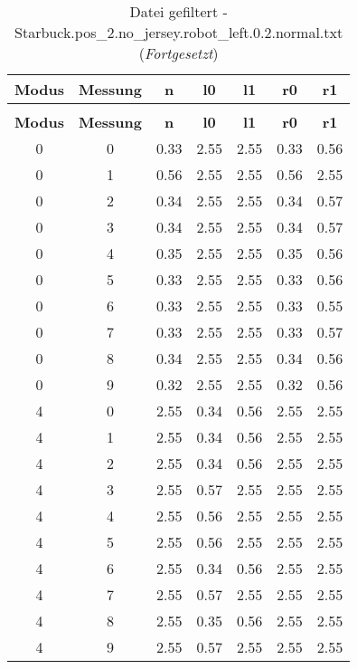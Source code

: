 \begin{longtable}{|c|c||c||c|c||c|c|}
	\caption{Datei gefiltert - Starbuck.pos\_2.no\_jersey.robot\_left.0.2.normal.txt} \label{tab:Starbuck.pos-2.no-jersey.robot-left.0.2.normal.txt} \\ \hline
	\textbf{Modus} & \textbf{Messung} & \textbf{n} & \textbf{l0} & \textbf{l1} & \textbf{r0} & \textbf{r1}\\ \hline
	\endfirsthead
	\caption[]{Datei gefiltert - Starbuck.pos\_2.no\_jersey.robot\_left.0.2.normal.txt (\emph{Fortgesetzt})} \\ \hline
	\textbf{Modus} & \textbf{Messung} & \textbf{n} & \textbf{l0} & \textbf{l1} & \textbf{r0} & \textbf{r1}\\ \hline
	\endhead
	0 & 0 & 0.33 & 2.55 & 2.55 & 0.33 & 0.56 \\ \hline
	0 & 1 & 0.56 & 2.55 & 2.55 & 0.56 & 2.55 \\ \hline
	0 & 2 & 0.34 & 2.55 & 2.55 & 0.34 & 0.57 \\ \hline
	0 & 3 & 0.34 & 2.55 & 2.55 & 0.34 & 0.57 \\ \hline
	0 & 4 & 0.35 & 2.55 & 2.55 & 0.35 & 0.56 \\ \hline
	0 & 5 & 0.33 & 2.55 & 2.55 & 0.33 & 0.56 \\ \hline
	0 & 6 & 0.33 & 2.55 & 2.55 & 0.33 & 0.55 \\ \hline
	0 & 7 & 0.33 & 2.55 & 2.55 & 0.33 & 0.57 \\ \hline
	0 & 8 & 0.34 & 2.55 & 2.55 & 0.34 & 0.56 \\ \hline
	0 & 9 & 0.32 & 2.55 & 2.55 & 0.32 & 0.56 \\ \hline
	4 & 0 & 2.55 & 0.34 & 0.56 & 2.55 & 2.55 \\ \hline
	4 & 1 & 2.55 & 0.34 & 0.56 & 2.55 & 2.55 \\ \hline
	4 & 2 & 2.55 & 0.34 & 0.56 & 2.55 & 2.55 \\ \hline
	4 & 3 & 2.55 & 0.57 & 2.55 & 2.55 & 2.55 \\ \hline
	4 & 4 & 2.55 & 0.56 & 2.55 & 2.55 & 2.55 \\ \hline
	4 & 5 & 2.55 & 0.56 & 2.55 & 2.55 & 2.55 \\ \hline
	4 & 6 & 2.55 & 0.34 & 0.56 & 2.55 & 2.55 \\ \hline
	4 & 7 & 2.55 & 0.57 & 2.55 & 2.55 & 2.55 \\ \hline
	4 & 8 & 2.55 & 0.35 & 0.56 & 2.55 & 2.55 \\ \hline
	4 & 9 & 2.55 & 0.57 & 2.55 & 2.55 & 2.55 \\ \hline

\end{longtable}
